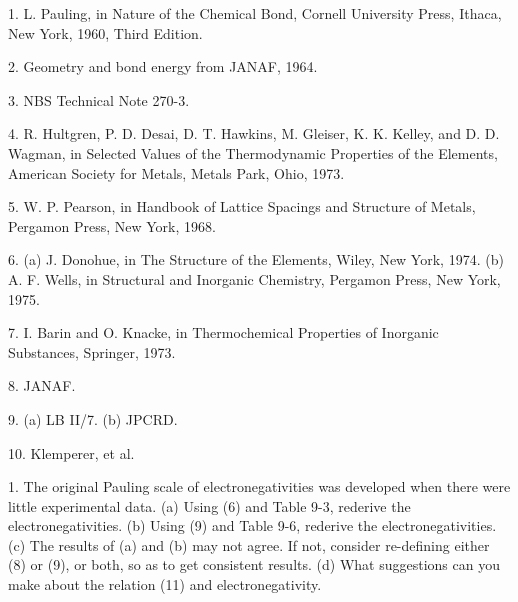 \bigskip


\item {1.}  L. Pauling, in Nature of the Chemical Bond, Cornell 
University Press, Ithaca, New York, 1960, Third Edition.

\item {2.} Geometry and bond energy from JANAF, 1964.

\item {3.} NBS Technical Note 270-3.

\item {4.} R. Hultgren, P. D. Desai, D. T. Hawkins, M. Gleiser, K. K. Kelley,
and D. D. Wagman, in Selected Values of the Thermodynamic Properties
of the Elements, American Society for Metals, Metals Park, Ohio, 1973.

\item {5.} W. P. Pearson, in Handbook of Lattice Spacings and Structure 
of Metals, Pergamon Press, New York, 1968.

\item {6.} (a) J. Donohue, in The Structure of the Elements, Wiley, New 
York, 1974.  (b) A. F. Wells, in Structural and Inorganic Chemistry, 
Pergamon Press, New York, 1975.

\item {7.} I. Barin and O. Knacke, in Thermochemical Properties of Inorganic
Substances, Springer, 1973.

\item {8.} JANAF.

\item {9.} (a) LB II/7.  (b) JPCRD.

\item {10.} Klemperer, et al.

\bigskip


\item {1.} The original Pauling scale of electronegativities was 
developed when there were little experimental data. (a) Using (6) and Table 
9-3, rederive the electronegativities.  (b) Using (9) and Table 9-6, 
rederive the electronegativities.  (c) The results of (a) and (b) may not
agree. If not, consider re-defining either (8) or (9), or both, so as to 
get consistent results.  (d) What suggestions can you make about the 
relation (11) and electronegativity.

